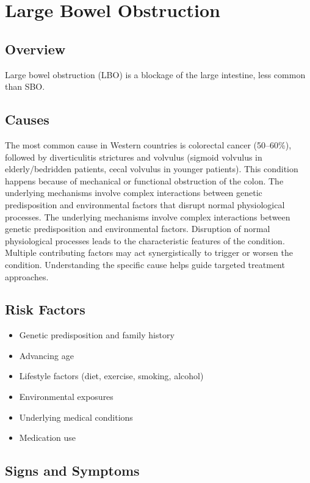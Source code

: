 \chapter{Large Bowel Obstruction}
\label{sec:Large Bowel Obstruction}

\section{Overview}
Large bowel obstruction (LBO) is a blockage of the large intestine, less common than SBO.
\section{Causes}
The most common cause in Western countries is colorectal cancer (50--60\%), followed by diverticulitis strictures and volvulus (sigmoid volvulus in elderly/bedridden patients, cecal volvulus in younger patients). This condition happens because of mechanical or functional obstruction of the colon. The underlying mechanisms involve complex interactions between genetic predisposition and environmental factors that disrupt normal physiological processes. The underlying mechanisms involve complex interactions between genetic predisposition and environmental factors. Disruption of normal physiological processes leads to the characteristic features of the condition. Multiple contributing factors may act synergistically to trigger or worsen the condition. Understanding the specific cause helps guide targeted treatment approaches.
\section{Risk Factors}


\begin{itemize}[noitemsep]
  \item Genetic predisposition and family history
  \item Advancing age
  \item Lifestyle factors (diet, exercise, smoking, alcohol)
  \item Environmental exposures
  \item Underlying medical conditions
  \item Medication use
\end{itemize}
\section{Signs and Symptoms}

